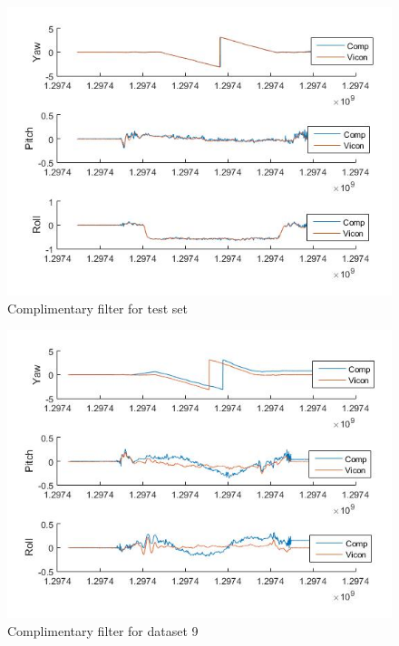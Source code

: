 \documentclass[fleqn,10pt]{SelfArx} %
\begin{document}
\begin{figure}[h]
\centering
\includegraphics[scale=0.45]{com_good.jpg}
\caption{Complimentary filter for test set}
\label{fig:com_g}
\end{figure}

\begin{figure}[h]
\centering
\includegraphics[scale=0.45]{com_bad.jpg}
\caption{Complimentary filter for dataset 9}
\label{fig:com_b}
\end{figure}
\end{document}
